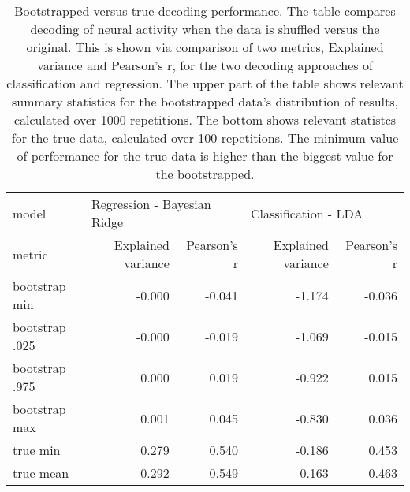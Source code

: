     \begin{table}[]
        \centering
        \begin{tabular}{l|rr|rr}
            \hline
            model & \multicolumn{2}{l}{Regression - Bayesian Ridge} & \multicolumn{2}{l}{Classification - LDA} \\
            metric & Explained variance & Pearson's r & Explained variance & Pearson's r \\
            \hline
            bootstrap min  &             -0.000 &      -0.041 &             -1.174 &      -0.036 \\
            bootstrap .025  &             -0.000 &      -0.019 &             -1.069 &      -0.015 \\
            bootstrap .975 &              0.000 &       0.019 &             -0.922 &       0.015 \\
            bootstrap max  &              0.001 &       0.045 &             -0.830 &       0.036 \\
            \hline
            true min  &              0.279 &       0.540 &             -0.186 &       0.453 \\
            true mean &              0.292 &       0.549 &             -0.163 &       0.463 \\
            \hline
        \end{tabular}
        \caption{Bootstrapped versus true decoding performance. The table compares decoding of neural activity when the data is shuffled versus the original. This is shown via comparison of two metrics, Explained variance and Pearson's r, for the two decoding approaches of classification and regression. The upper part of the table shows relevant summary statistics for the bootstrapped data's distribution of results, calculated over 1000 repetitions. The bottom shows relevant statistcs for the true data, calculated over 100 repetitions. The minimum value of performance for the true data is higher than the biggest value for the bootstrapped.}
        \label{tab:bootstrap_time_representation}
    \end{table}
